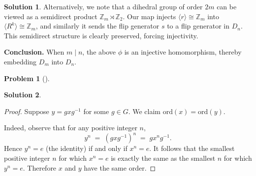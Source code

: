 \documentclass[12pt]{article}
\theoremstyle{definition} %
\newtheorem{solution}{Solution}
\newtheorem{problem}{Problem}
\theoremstyle{plain} %
\begin{document}
\begin{solution}
Alternatively, we note that a dihedral group of order \(2m\) can be viewed 
as a semidirect product \(\mathbb{Z}_m\rtimes\mathbb{Z}_2\).  
Our map injects \(\langle r\rangle \cong \mathbb{Z}_m\) into \(\langle R^k\rangle\cong \mathbb{Z}_m\), 
and similarly it sends the flip generator \(s\) to a flip generator in \(D_n\).  
This semidirect structure is clearly preserved, forcing injectivity.

\bigskip

\noindent
\textbf{Conclusion.}  
When \(m\mid n\), the above \(\phi\) is an injective homomorphism, 
thereby embedding \(D_m\) into \(D_n\).  
\qedsymbol
\end{solution}
\begin{problem}[]
    
\end{problem}
\begin{solution}
    \begin{proof}
        Suppose $y = g x g^{-1}$ for some $g \in G$.  
        We claim $\mathrm{ord}(x) = \mathrm{ord}(y)$. 
        
        Indeed, observe that for any positive integer $n$,
        \[
        y^n
        \;=\;
        (g x g^{-1})^n
        \;=\;
        g x^n g^{-1}.
        \]
        Hence $y^n = e$ (the identity) if and only if $x^n = e$.  
        It follows that the smallest positive integer $n$ for which $x^n=e$ 
        is exactly the same as the smallest $n$ for which $y^n = e$.  
        Therefore $x$ and $y$ have the same order.
        \end{proof}
\end{solution}
\end{document}
